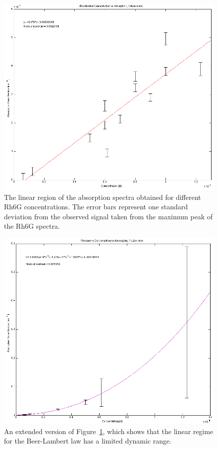 \begin{figure}[th]
\begin{center}
\includegraphics[width=\textwidth]{figures/rhodamine_concentration_vs_conc_linear.png}
\end{center}
\caption{The linear region of the absorption spectra obtained for different Rh6G concentrations. The error bars represent one standard deviation from the observed signal taken from the maximum peak of the Rh6G spectra.}
\label{fig:rh6g_lin}
\end{figure}

\begin{figure}[th]
\begin{center}
\includegraphics[width=\textwidth]{figures/rhodamine_concentration_vs_conc_non_linear.png}
\end{center}
\caption{An extended version of Figure~\ref{fig:rh6g_lin}, which shows that the linear regime for the Beer-Lambert law has a limited dynamic range.}
\label{fig:rh6g_nonlin}
\end{figure}

